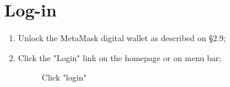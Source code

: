 \documentclass[ManualeUtente]{subfiles}
\begin{document}
\section{Log-in}
\begin{enumerate}
	\item Unlock the MetaMask digital wallet as described on \S 2.9;
	\item Click the "Login" link on the homepage or on menu bar;
	\begin{figure}[H]
		\centering
		\caption{Click "login"}
		\label{fig:Click "login"}
	\end{figure}
\end{enumerate}
\end{document}
